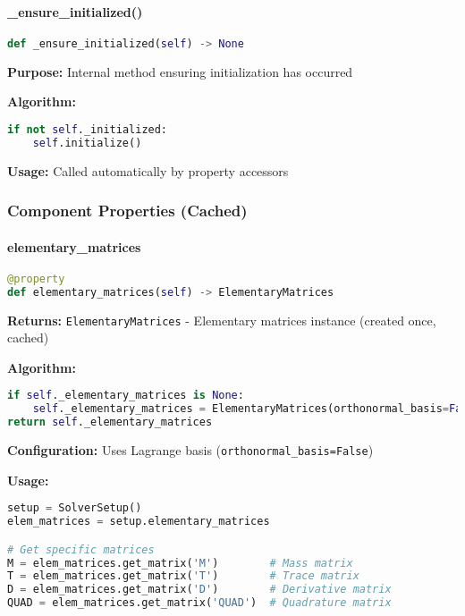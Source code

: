 \paragraph{\_ensure\_initialized()}
\begin{lstlisting}[language=Python, caption=Ensure Initialized Method]
def _ensure_initialized(self) -> None
\end{lstlisting}

\textbf{Purpose:} Internal method ensuring initialization has occurred

\textbf{Algorithm:}
\begin{lstlisting}[language=Python, caption=Ensure Initialized Implementation]
if not self._initialized:
    self.initialize()
\end{lstlisting}

\textbf{Usage:} Called automatically by property accessors

\subsubsection{Component Properties (Cached)}

\paragraph{elementary\_matrices}
\begin{lstlisting}[language=Python, caption=Elementary Matrices Property]
@property
def elementary_matrices(self) -> ElementaryMatrices
\end{lstlisting}

\textbf{Returns:} \texttt{ElementaryMatrices} - Elementary matrices instance (created once, cached)

\textbf{Algorithm:}
\begin{lstlisting}[language=Python, caption=Elementary Matrices Property Implementation]
if self._elementary_matrices is None:
    self._elementary_matrices = ElementaryMatrices(orthonormal_basis=False)
return self._elementary_matrices
\end{lstlisting}

\textbf{Configuration:} Uses Lagrange basis (\texttt{orthonormal\_basis=False})

\textbf{Usage:}
\begin{lstlisting}[language=Python, caption=Elementary Matrices Usage]
setup = SolverSetup()
elem_matrices = setup.elementary_matrices

# Get specific matrices
M = elem_matrices.get_matrix('M')        # Mass matrix
T = elem_matrices.get_matrix('T')        # Trace matrix
D = elem_matrices.get_matrix('D')        # Derivative matrix
QUAD = elem_matrices.get_matrix('QUAD')  # Quadrature matrix
\end{lstlisting}

